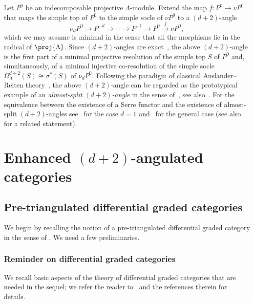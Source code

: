 \documentclass[a4paper]{amsart}
\begin{document}
Let $P^0$ be an indecomposable projective $\Lambda$-module. Extend the map
${f\colon P^0\to \nu P^0}$ that maps the simple top of $P^0$ to the simple socle of $\nu P^0$ to a
$(d+2)$-angle
\[
  \nu_d P^{0}\to P^{-d}\to\cdots\to P^{-1}\to P^0\stackrel{f}{\to}\nu P^0,
\]
which we may assume is minimal in the sense that all the morphisms lie in the
radical of $\proj{\Lambda}$. Since $(d+2)$-angles are
exact~\cite[Prop.~2.5(a)]{GKO13}, the above $(d+2)$-angle is the first part of a
minimal projective resolution of the simple top $S$ of $P^0$ and,
simultaneously, of a minimal injective co-resolution of the simple socle
$\Omega_{\Lambda}^{d+2}(S)\cong\sigma^*(S)$ of $\nu_dP^0$.
Following the paradigm of classical Auslander--Reiten
theory~\cite{AR75,AR78}, the above $(d+2)$-angle can be regarded as the prototypical example of an
\emph{almost-split $(d+2)$-angle} in the sense of~\cite[3.8]{IY08}, see
also~\cite[Def.~5.1]{Fed19}. For the equivalence between the existence of a Serre
functor and the existence of almost-split $(d+2)$-angles
see~\cite[Thm.~I.2.4]{RVdB02} for the case $d=1$ and~\cite[Thm.~1.5]{Zho22} for
the general case (see
also~\cite[Prop.~1.2.]{Ami07} for a related statement).

\section{Enhanced $(d+2)$-angulated categories}
\label{sec:dg_d+2}

\subsection{Pre-triangulated differential graded categories}

We begin by recalling the notion of a pre-triangulated differential graded
category in the sense of \cite{BK90}. We need a few preliminaries.

\subsubsection{Reminder on differential graded categories}

We recall basic aspects of the theory of differential graded categories that are
needed in the sequel; we refer the reader to~\cite{Kel06} and the references
therein for details.
\end{document}
